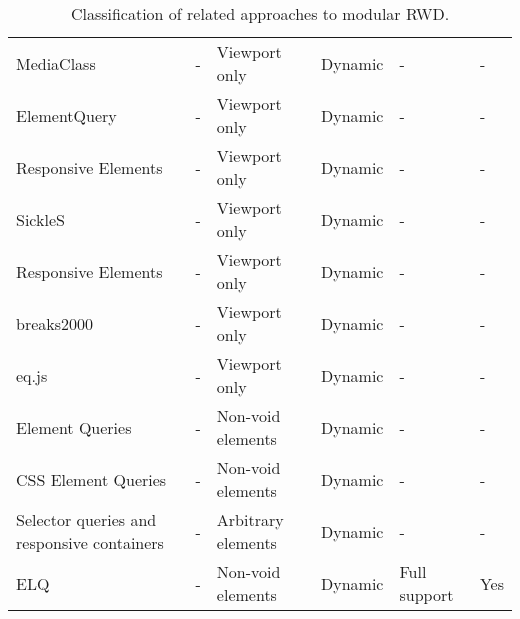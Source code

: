 \documentclass{acm_proc_article-sp}
\newcommand{\elq}{ELQ}
\begin{document}
\begin{table*}[ht!]
\begin{tabular}[t]{ p{3cm} l l l l l }
       MediaClass \cite{eq_imp_mediaclass}                        &                                 - &   Viewport only &                 Dynamic &    -                  & -  \\
       ElementQuery \cite{eq_imp_elementquery}                    &                                 - &   Viewport only &                 Dynamic &    -                  & -  \\
       Responsive Elements \cite{eq_imp_responsive-elements}      &                                 - &   Viewport only &                 Dynamic &    -                  & -  \\
       SickleS \cite{eq_imp_sickles}                              &                                 - &   Viewport only &                 Dynamic &    -                  & -  \\
       Responsive Elements \cite{eq_imp_responsive-elements-2}    &                                 - &   Viewport only &                 Dynamic &    -                  & -  \\ 
       breaks2000 \cite{eq_imp_breaks2000}                        &                                 - &   Viewport only &                 Dynamic &    -                  & -  \\
       eq.js \cite{eq_imp_eqjs}                                   &                                 - &   Viewport only &                 Dynamic &    -                  & -  \\
       Element Queries \cite{eq_imp_element-queries}              &                                 - &   Non-void elements &             Dynamic &    -                  & -  \\
       CSS Element Queries \cite{eq_imp_css-element-queries}      &                                 - &   Non-void elements &             Dynamic &    -                  & -  \\
       Selector queries and responsive containers \cite{eq_imp_selector_queries}                  & - &   Arbitrary elements &            Dynamic &    -                  & -  \\
       \elq{}                                                                                     & - &   Non-void elements &             Dynamic &    Full support       & Yes \\
    \end{tabular}
    \caption{Classification of related approaches to modular RWD.}
    \label{table:approaches-classifications}
  \end{table*}
\end{document}
